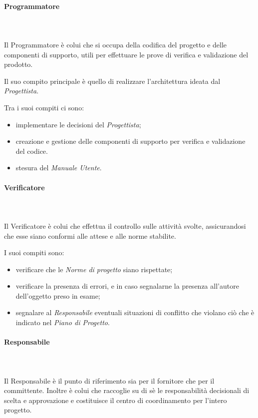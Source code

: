    			\paragraph{Programmatore} \mbox{}\\ \mbox{}\\
   			Il Programmatore è colui che si occupa della codifica del progetto e delle componenti di supporto, utili per effettuare le prove di verifica e validazione del prodotto.
   			
   			Il suo compito principale è quello di realizzare l'architettura ideata dal \textit{Progettista}.
   			
   			Tra i suoi compiti ci sono:
   			\begin{itemize}
   				\item implementare le decisioni del \textit{Progettista};
   				\item creazione e gestione delle componenti di supporto per verifica e validazione del codice.
   				\item stesura del \textit{Manuale Utente}.
   			\end{itemize}
   			\paragraph{Verificatore} \mbox{}\\ \mbox{}\\
   			Il Verificatore è colui che effettua il controllo sulle attività svolte, assicurandosi che esse siano conformi alle attese e alle norme stabilite.
   			
   			I suoi compiti sono:
   			\begin{itemize}
   				\item verificare che le \textit{Norme di progetto} siano rispettate;
   				\item verificare la presenza di errori, e in caso segnalarne la presenza all'autore dell'oggetto preso in esame;
   				\item segnalare al \textit{Responsabile} eventuali situazioni di conflitto che violano ciò che è indicato nel \textit{Piano di Progetto}.
   			\end{itemize}
   			\paragraph{Responsabile} \mbox{}\\ \mbox{}\\
   			Il Responsabile è il punto di riferimento sia per il fornitore che per il committente. Inoltre è colui che raccoglie su di sè le responsabilità decisionali di scelta e approvazione e costituisce il centro di coordinamento per l'intero progetto.
   			

